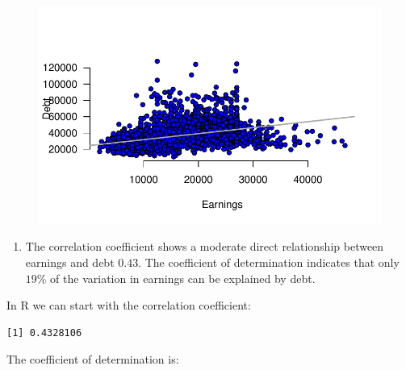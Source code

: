 \documentclass[
  letterpaper,
  DIV=11,
  numbers=noendperiod]{scrreprt}
\newenvironment{Shaded}{\begin{snugshade}}{\end{snugshade}}
\newcommand{\FunctionTok}[1]{\textcolor[rgb]{0.28,0.35,0.67}{#1}}
\newcommand{\NormalTok}[1]{\textcolor[rgb]{0.00,0.23,0.31}{#1}}
\newcommand{\SpecialCharTok}[1]{\textcolor[rgb]{0.37,0.37,0.37}{#1}}
\providecommand{\tightlist}{%
  \setlength{\itemsep}{0pt}\setlength{\parskip}{0pt}}\usepackage{longtable,booktabs,array}
\begin{document}
\begin{figure}[H]

{\centering \includegraphics{./07-RegressionI_files/figure-pdf/unnamed-chunk-17-1.pdf}

}

\end{figure}

\begin{blackbox}

\begin{enumerate}
\def\labelenumi{\arabic{enumi}.}
\setcounter{enumi}{1}
\tightlist
\item
  The correlation coefficient shows a moderate direct relationship
  between earnings and debt \(0.43\). The coefficient of determination
  indicates that only \(19\)\% of the variation in earnings can be
  explained by debt.
\end{enumerate}

\end{blackbox}

In R we can start with the correlation coefficient:

\begin{Shaded}
\end{Shaded}

\begin{verbatim}
[1] 0.4328106
\end{verbatim}

The coefficient of determination is:
\end{document}
